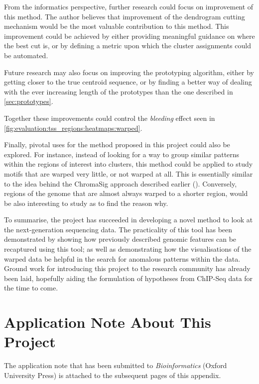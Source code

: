\documentclass[parskip]{cs4rep}
\begin{document}
From the informatics perspective, further research could focus on improvement of this method.
The author believes that improvement of the dendrogram cutting mechanism would be the most valuable contribution to this method. This improvement could be achieved by either providing meaningful guidance on where the best cut is, or by defining a metric upon which the cluster assignments could be automated.

Future research may also focus on improving the prototyping algorithm, either by getting closer to the true centroid sequence, or by finding a better way of dealing with the ever increasing length of the prototypes than the one described in \autoref{sec:prototypes}.

Together these improvements could control the \emph{bleeding} effect seen in \autoref{fig:evaluation:tss_regions:heatmaps:warped}.

Finally, pivotal uses for the method proposed in this project could also be explored.
For instance, instead of looking for a way to group similar patterns within the regions of interest into clusters, this method could be applied to study motifs that are warped very little, or not warped at all. This is essentially similar to the idea behind the ChromaSig approach described earlier (\cite{Hon:2008wv}). Conversely, regions of the genome that are almost always warped to a shorter region, would be also interesting to study as to find the reason why.

To summarise, the project has succeeded in developing a novel method to look at the next-generation sequencing data. The practicality of this tool has been demonstrated by showing how previously described genomic features can be recaptured using this tool; as well as demonstrating how the visualisations of the warped data be helpful in the search for anomalous patterns within the data.
Ground work for introducing this project to the research community has already been laid, hopefully aiding the formulation of hypotheses from ChIP-Seq data for the time to come.




\appendix
\chapter{Application Note About This Project}
The application note that has been submitted to \emph{Bioinformatics} (Oxford University Press) is attached to the subsequent pages of this appendix.



\label{sec:supplementary-figures}
\end{document}
